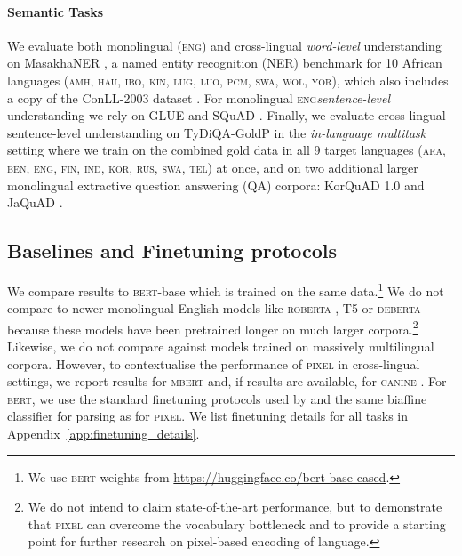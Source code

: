 \documentclass{article}
\newcommand{\model}{\textsc{pixel}\xspace}
\newcommand{\arabi}{\textsc{ara}\xspace}
\newcommand{\english}{\textsc{eng}\xspace}
\newcommand{\japanese}{\textsc{jpn}\xspace}
\newcommand{\korean}{\textsc{kor}\xspace}
\newcommand{\amharic}{\textsc{amh}\xspace}
\newcommand{\hausa}{\textsc{hau}\xspace}
\newcommand{\igbo}{\textsc{ibo}\xspace}
\newcommand{\kinyarwanda}{\textsc{kin}\xspace}
\newcommand{\luganda}{\textsc{lug}\xspace}
\newcommand{\luo}{\textsc{luo}\xspace}
\newcommand{\naija}{\textsc{pcm}\xspace}
\newcommand{\swahili}{\textsc{swa}\xspace}
\newcommand{\wolof}{\textsc{wol}\xspace}
\newcommand{\yoruba}{\textsc{yor}\xspace}
\newcommand{\russian}{\textsc{rus}\xspace}
\newcommand{\bengali}{\textsc{ben}\xspace}
\newcommand{\finnish}{\textsc{fin}\xspace}
\newcommand{\indonesian}{\textsc{ind}\xspace}
\newcommand{\telugu}{\textsc{tel}\xspace}
\begin{document}
\vspace{-2mm}
\paragraph{Semantic Tasks} We evaluate both monolingual (\english) and cross-lingual \emph{word-level} understanding on MasakhaNER \citep{adelani-etal-2021-masakhaner}, a named entity recognition (NER) benchmark for 10 African languages (\amharic, \hausa, \igbo, \kinyarwanda, \luganda, \luo, \naija, \swahili, \wolof, \yoruba), which also includes a copy of the ConLL-2003 dataset \citep[\english; ][]{tjong-kim-sang-de-meulder-2003-introduction}. For monolingual \english \emph{sentence-level} understanding we rely on GLUE \citep{wang-etal-2018-glue} and SQuAD \citep{rajpurkar-etal-2016-squad}. 
Finally, we evaluate cross-lingual sentence-level understanding on TyDiQA-GoldP \citep{clark-etal-2020-tydi} in the \emph{in-language multitask} setting where we train on the combined gold data in all 9 target languages (\arabi, \bengali, \english, \finnish, \indonesian, \korean, \russian, \swahili, \telugu) at once, and on two additional larger monolingual extractive question answering (QA) corpora: KorQuAD 1.0 \citep[\korean; ][]{lim-etal-2019-korquad} and JaQuAD \citep[\japanese; ][]{so2022jaquad}.

\vspace{-2mm}
\subsection{Baselines and Finetuning protocols}
\vspace{-2mm}

We compare results to \textsc{bert}-base which is trained on the same data.\footnote{We use \textsc{bert} weights from \url{https://huggingface.co/bert-base-cased}.} We do not compare to newer monolingual English models like \textsc{roberta} \citep{DBLP:journals/corr/abs-1907-11692}, \textsc{T5} \citep{raffel-etal-2020-t5} or \textsc{deberta} \citep{he-etal-2020-deberta, he-etal-2021-debertav3} because these models have been pretrained longer on much larger corpora.\footnote{We do not intend to claim state-of-the-art performance, but to demonstrate that \model can overcome the vocabulary bottleneck and to provide a starting point for further research on pixel-based encoding of language.} 
Likewise, we do not compare against models trained on massively multilingual corpora.
However, to contextualise the performance of \model in cross-lingual settings, we report results for \textsc{mbert} and, if results are available, for \textsc{canine} \citep{DBLP:journals/tacl/ClarkGTW22}. For \textsc{bert}, we use the standard finetuning protocols used by \cite{devlin-etal-2019-bert} and the same biaffine classifier for parsing as for \model. We list finetuning details for all tasks in Appendix~\ref{app:finetuning_details}.
\end{document}
